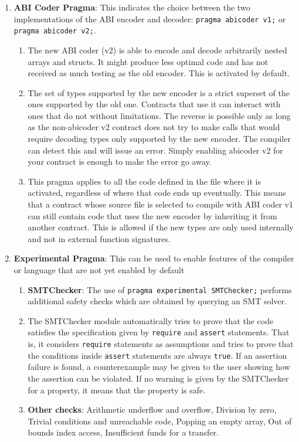 \begin{enumerate}
\item\textbf{ABI Coder Pragma}: This indicates the choice between the two implementations of the ABI encoder and decoder: \verb|pragma abicoder v1;| or \verb|pragma abicoder v2;|.
    \begin{enumerate}
    \item The new ABI coder (v2) is able to encode and decode arbitrarily nested arrays and structs. It might produce less optimal code and has not received as much testing as the old encoder. This is activated by default.
    \item The set of types supported by the new encoder is a strict superset of the ones supported by the old one. Contracts that use it can interact with ones that do not without limitations. The reverse is possible only as long as the non-abicoder v2 contract does not try to make calls that would require decoding types only supported by the new encoder. The compiler can detect this and will issue an error. Simply enabling abicoder v2 for your contract is enough to make the error go away.
    \item This pragma applies to all the code defined in the file where it is activated, regardless of where that code ends up eventually. This means that a contract whose source file is selected to compile with ABI coder v1 can still contain code that uses the new encoder by inheriting it from another contract. This is allowed if the new types are only used internally and not in external function signatures.
    \end{enumerate}

\item\textbf{Experimental Pragma}: This can be used to enable features of the compiler or language that are not yet enabled by default
    \begin{enumerate}
    \item\textbf{SMTChecker}: The use of \verb|pragma experimental SMTChecker;| performs additional safety checks which are obtained by querying an SMT solver.
    \item The SMTChecker module automatically tries to prove that the code satisfies the specification given by \verb|require| and \verb|assert| statements. That is, it considers \verb|require| statements as assumptions and tries to prove that the conditions inside \verb|assert| statements are always \verb|true|. If an assertion failure is found, a counterexample may be given to the user showing how the assertion can be violated. If no warning is given by the SMTChecker for a property, it means that the property is safe.
    \item\textbf{Other checks}: Arithmetic underflow and overflow, Division by zero, Trivial conditions and unreachable code, Popping an empty array, Out of bounds index access, Insufficient funds for a transfer.
    \end{enumerate}


\end{enumerate}
